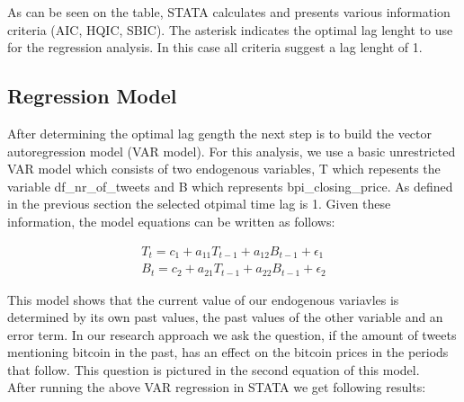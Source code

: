 \documentclass[a4paper,american,12pt]{article}
\begin{document}
\begin{spacing}{1.2}
As can be seen on the table, STATA calculates and presents various information criteria (AIC, HQIC, SBIC). The asterisk indicates the optimal lag lenght to use for the regression analysis. In this case all criteria suggest a lag lenght of 1.
		
\subsection{Regression Model}
After determining the optimal lag gength the next step is to build the vector autoregression model (VAR model).
For this analysis, we use a basic unrestricted VAR model which consists of two endogenous variables, T which repesents the variable df\_nr\_of\_tweets and B which represents bpi\_closing\_price. As defined in the previous section the selected otpimal time lag is 1. Given these information, the model equations can be written as follows:

\begin{equation}
\begin{split}
T_t = c_1 + a_{11}T_{t-1} + a_{12}B_{t-1} + \epsilon_1 \\
B_t = c_2 + a_{21}T_{t-1} + a_{22}B_{t-1} + \epsilon_2
\end{split}
\end{equation}

This model shows that the current value of our endogenous variavles is determined by its own past values, the past values of the other variable and an error term. In our research approach we ask the question, if the amount of tweets mentioning bitcoin in the past, has an effect on the bitcoin prices in the periods that follow. This question is pictured in the second equation of this model.\\

After running the above VAR regression in STATA we get following results:
	

\end{spacing}
\end{document}
